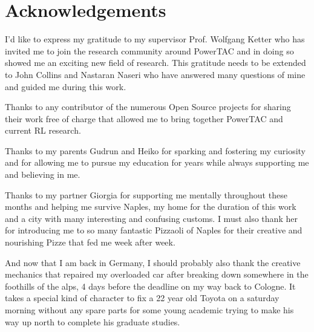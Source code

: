 \section*{Acknowledgements}

I'd like to express my gratitude to my supervisor Prof. Wolfgang Ketter who has invited me to join the research
community around PowerTAC and in doing so showed me an exciting new field of research. This gratitude needs to be
extended to John Collins and Nastaran Naseri who have answered many questions of mine and guided me during this work.

Thanks to any contributor of the numerous Open Source projects for sharing their work free of charge that allowed me to
bring together PowerTAC and current RL research.

Thanks to my parents Gudrun and Heiko for sparking and fostering my curiosity and for allowing me to pursue my education for years while
always supporting me and believing in me. 

Thanks to my partner Giorgia for supporting me mentally throughout these months and helping me survive Naples, my home
for the duration of this work and a city with many interesting and confusing customs. I must also thank her for
introducing me to so many fantastic Pizzaoli of Naples for their creative and nourishing Pizze that fed me
week after week. 

And now that I am back in Germany, I should probably also thank the creative mechanics that repaired my overloaded car
after breaking down somewhere in the foothills of the alps, 4 days before the deadline on my way back to Cologne. It
takes a special kind of character to fix a 22 year old Toyota on a saturday morning without any spare parts for some
young academic trying to make his way up north to complete his graduate studies. 

